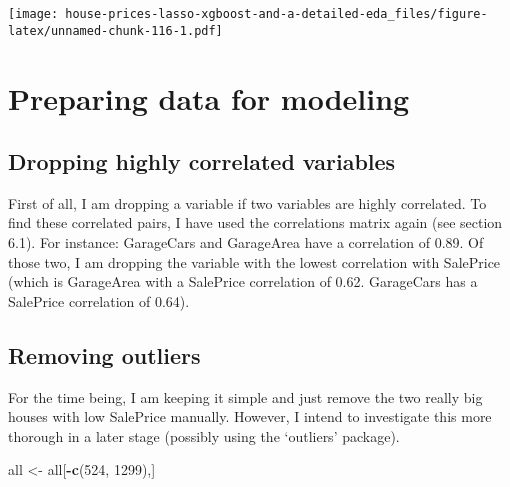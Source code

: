\documentclass[]{article}
\newenvironment{Shaded}{\begin{snugshade}}{\end{snugshade}}
\newcommand{\KeywordTok}[1]{\textcolor[rgb]{0.13,0.29,0.53}{\textbf{#1}}}
\newcommand{\DecValTok}[1]{\textcolor[rgb]{0.00,0.00,0.81}{#1}}
\newcommand{\StringTok}[1]{\textcolor[rgb]{0.31,0.60,0.02}{#1}}
\newcommand{\OperatorTok}[1]{\textcolor[rgb]{0.81,0.36,0.00}{\textbf{#1}}}
\newcommand{\NormalTok}[1]{#1}
\begin{document}
\texttt{[image: house-prices-lasso-xgboost-and-a-detailed-eda\_files/figure-latex/unnamed-chunk-116-1.pdf]}

\section{Preparing data for modeling}\label{preparing-data-for-modeling}

\subsection{Dropping highly correlated
variables}\label{dropping-highly-correlated-variables}

First of all, I am dropping a variable if two variables are highly
correlated. To find these correlated pairs, I have used the correlations
matrix again (see section 6.1). For instance: GarageCars and GarageArea
have a correlation of 0.89. Of those two, I am dropping the variable
with the lowest correlation with SalePrice (which is GarageArea with a
SalePrice correlation of 0.62. GarageCars has a SalePrice correlation of
0.64).

\begin{Shaded}
\end{Shaded}

\subsection{Removing outliers}\label{removing-outliers}

For the time being, I am keeping it simple and just remove the two
really big houses with low SalePrice manually. However, I intend to
investigate this more thorough in a later stage (possibly using the
`outliers' package).

\begin{Shaded}
\begin{Highlighting}[]
\NormalTok{all <-}\StringTok{ }\NormalTok{all[}\OperatorTok{-}\KeywordTok{c}\NormalTok{(}\DecValTok{524}\NormalTok{, }\DecValTok{1299}\NormalTok{),]}
\end{Highlighting}
\end{Shaded}
\end{document}
